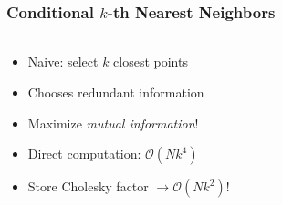 \documentclass{beamer}                             %
\begin{document}
\begin{frame}
\frametitle{Conditional \( k \)-th Nearest Neighbors}
\framesubtitle{}

\begin{columns}
  \begin{column}{0.6\textwidth}
    \begin{itemize}
      \item<1-> Naive: select \( k \) closest points

      \item<2-> Chooses redundant information

      \item<3-> Maximize \emph{mutual information}!

      \item<5-> Direct computation: \( \mathcal{O}(N k^4) \)

      \item<6-> Store Cholesky factor \( \rightarrow \mathcal{O}(N k^2) \)!
    \end{itemize}
  \end{column}
  \begin{column}{0.4\textwidth}



\end{column}
\end{columns}
\end{frame}
\end{document}
